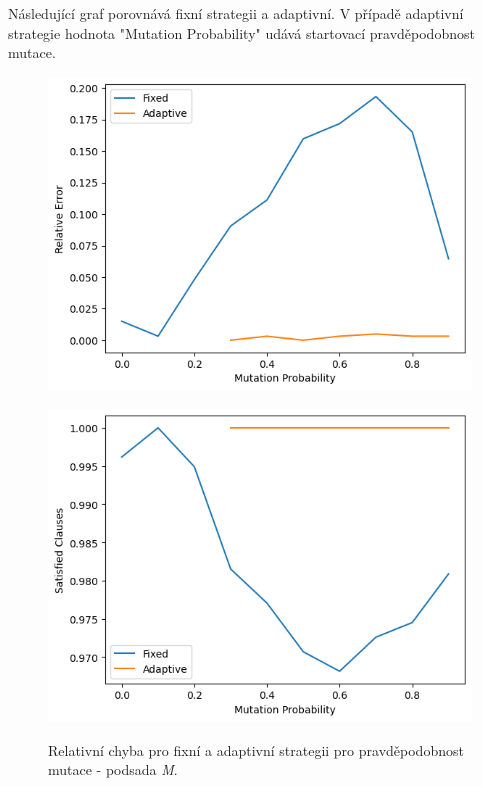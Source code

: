 \documentclass[12pt]{article}
\begin{document}
Následující graf porovnává fixní strategii a adaptivní. V případě adaptivní strategie hodnota "Mutation Probability" udává startovací pravděpodobnost mutace.

\begin{figure}[H]
    \centering
    \caption{Relativní chyba pro fixní a adaptivní strategii pro pravděpodobnost mutace - podsada \textit{M}.}
    \begin{minipage}[b]{0.5\textwidth}
        \centering
        \includegraphics[width=\textwidth]{images/mut_rel_error_M.png}
        \label{fig:elitism_relative_error}
    \end{minipage}%
    \hfill
    \begin{minipage}[b]{0.5\textwidth}
        \centering
        \includegraphics[width=\textwidth]{images/satisfied_rel_error_M.png}
        \label{fig:elitism_satisfied_clauses}
    \end{minipage}
\end{figure}
\end{document}
